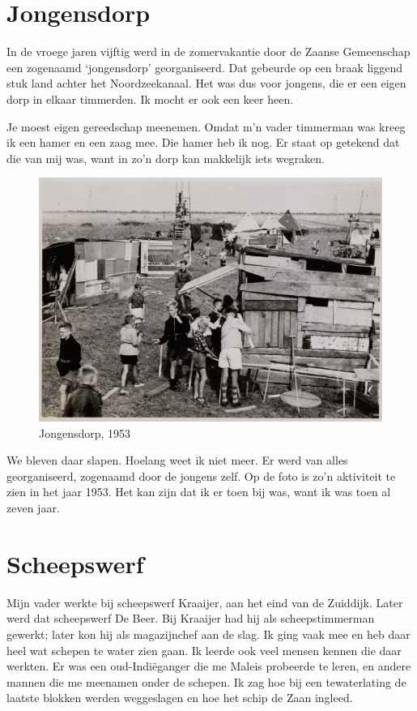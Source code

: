 \documentclass[10pt,twoside, openright]{memoir}
\newlength{\drop}%
\begin{document}
\chapter{Jongensdorp} %
\label{cha:jongensdrop}

In de vroege jaren vijftig werd in de zomervakantie door de Zaanse Gemeenschap een zogenaamd `jongensdorp' georganiseerd. Dat gebeurde op een braak liggend stuk land achter het Noordzeekanaal. Het was dus voor jongens, die er een eigen dorp in elkaar timmerden. Ik mocht er ook een keer heen. 

Je moest eigen gereedschap meenemen. Omdat m’n vader timmerman was kreeg ik een hamer en een zaag mee. Die hamer heb ik nog. Er staat op getekend dat die van mij was, want in zo’n dorp kan makkelijk iets wegraken. 

\begin{figure}
\includegraphics[width=\textwidth]{img/87-88jongensdorp}
\caption*{\footnotesize Jongensdorp, 1953}
\end{figure}

We bleven daar slapen. Hoelang weet ik niet meer. Er werd van alles georganiseerd, zogenaamd door de jongens zelf. Op de foto is zo’n aktiviteit te zien in het jaar 1953. Het kan zijn dat ik er toen bij was, want ik was toen al zeven jaar.

\chapter{Scheepswerf} %
\label{cha:scheepswerf}

Mijn vader werkte bij scheepswerf Kraaijer, aan het eind van de Zuiddijk. Later werd dat scheepswerf De Beer. Bij Kraaijer had hij als scheepstimmerman gewerkt; later kon hij als magazijnchef aan de slag. Ik ging vaak mee en heb daar heel wat schepen te water zien gaan. Ik leerde ook veel mensen kennen die daar werkten. Er was een oud-Indiëganger die me Maleis probeerde te leren, en andere mannen die me meenamen onder de schepen. Ik zag hoe bij een tewaterlating de laatste blokken werden weggeslagen en hoe het schip de Zaan ingleed. 
\end{document}
